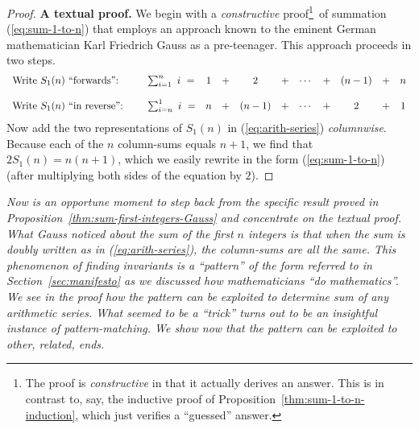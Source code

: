 \begin{proof}
{\bf A textual proof.}
%
We begin with a {\em constructive} proof\footnote{The proof is {\em
    constructive} in that it actually derives an answer.  This is in
  contrast to, say, the inductive proof of
  Proposition~\ref{thm:sum-1-to-n-induction}, which just verifies a
  ``guessed'' answer.}~of summation (\ref{eq:sum-1-to-n}) that employs
an approach known to the eminent German mathematician Karl Friedrich
Gauss  as a pre-teenager.
This approach proceeds in two steps.
\begin{equation}
\label{eq:arith-series}
\begin{array}{llccccccccc}
\mbox{Write $S_1(n)$ ``forwards'':} &
\hspace*{.2in}\sum_{i=1}^n \ i \ = & 1 & + & 2   & + & \cdots & + & (n-1) & + & n \\
 & & & & & & & & & &  \\
\mbox{Write $S_1(n)$ ``in reverse'':} &
\hspace*{.2in}\sum_{i=n}^1 \ i \ = & n & + & (n-1) & + & \cdots & + & 2   & + & 1
\end{array}
\end{equation}
Now add the two representations of $S_1(n)$ in (\ref{eq:arith-series})
{\em columnwise}.  Because each of the $n$ column-sums equals $n+1$,
we find that $2 S_1(n) = n(n+1)$, which we easily rewrite in the form
(\ref{eq:sum-1-to-n}) (after multiplying both sides of the equation by
$2$).
\end{proof}

\medskip

%
{\em Now is an opportune moment to step back from the specific result
  proved in Proposition~\ref{thm:sum-first-integers-Gauss} and
  concentrate on the textual proof.  What Gauss noticed about the sum
  of the first $n$ integers is that when the sum is doubly written as
  in (\ref{eq:arith-series}), the column-sums are all the same.  This
  phenomenon of {\em finding invariants} is a ``pattern'' of the form
  referred to in Section~\ref{sec:manifesto} as we discussed how
  mathematicians ``do mathematics''.  We see in the proof how the
  pattern can be exploited to determine sum of any arithmetic series.
  {\em What seemed to be a ``trick'' turns out to be an insightful
    instance of pattern-matching.}  We show now that the pattern can
  be exploited to other, related, ends.}

